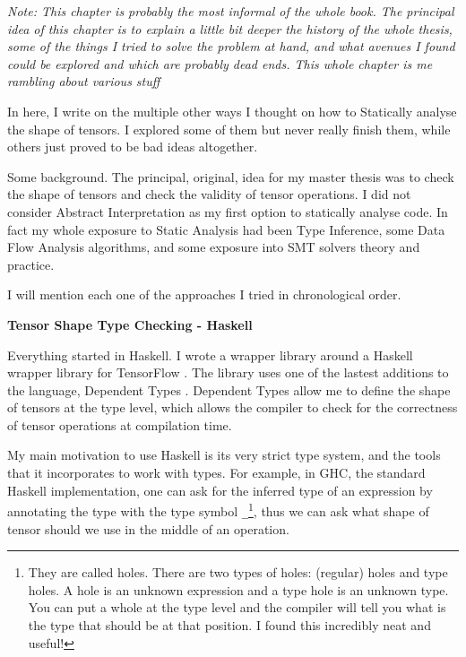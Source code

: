\documentclass[
11pt, %
english, %
singlespacing, %
headsepline, %
]{MastersDoctoralThesis} %
\newcommand{\nonsection}[1]{\vspace{3mm}\noindent\textbf{\large #1}\vspace{2mm}}
\begin{document}
{}

\emph{Note: This chapter is probably the most informal of the whole
book. The principal idea of this chapter is to explain a little bit
deeper the history of the whole thesis, some of the things I tried to
solve the problem at hand, and what avenues I found could be explored
and which are probably dead ends. This whole chapter is me rambling
about various stuff}

In here, I write on the multiple other ways I thought on how to
Statically analyse the shape of tensors. I explored some of them but
never really finish them, while others just proved to be bad ideas
altogether.

Some background. The principal, original, idea for my master thesis was
to check the shape of tensors and check the validity of tensor
operations. I did not consider Abstract Interpretation as my first
option to statically analyse code. In fact my whole exposure to Static
Analysis had been Type Inference, some Data Flow Analysis algorithms,
and some exposure into SMT solvers theory and practice.

I will mention each one of the approaches I tried in chronological
order.

{\nonsection{Tensor Shape Type Checking - Haskell}}

Everything started in Haskell. I wrote a wrapper library around a
Haskell wrapper library for TensorFlow \autocite{abadi_tensorflow_2016}.
The library uses one of the lastest additions to the language, Dependent
Types \autocite{eisenberg_dependent_2016}. Dependent Types allow me to
define the shape of tensors at the type level, which allows the compiler
to check for the correctness of tensor operations at compilation time.

My main motivation to use Haskell is its very strict type system, and
the tools that it incorporates to work with types. For example, in GHC,
the standard Haskell implementation, one can ask for the inferred type
of an expression by annotating the type with the type symbol
\texttt{\_}\footnote{They are called holes. There are two types of
  holes: (regular) holes and type holes. A hole is an unknown expression
  and a type hole is an unknown type. You can put a whole at the type
  level and the compiler will tell you what is the type that should be
  at that position. I found this incredibly neat and useful!}, thus we
can ask what shape of tensor should we use in the middle of an
operation.
\end{document}
